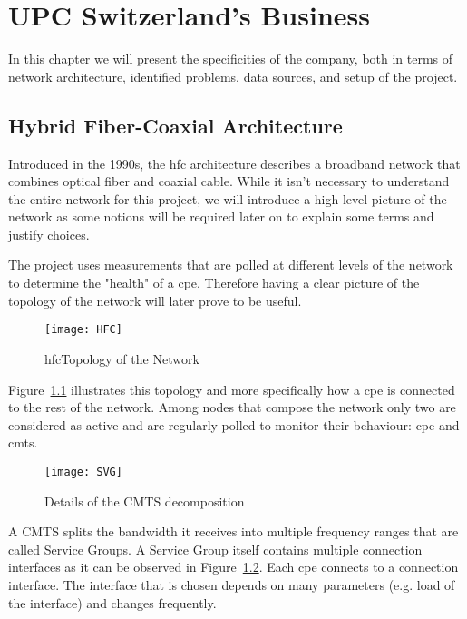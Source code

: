 \chapter{UPC Switzerland's Business}
In this chapter we will present the specificities of the company, both in terms of network architecture, identified problems, data sources, and setup of the project.

\section{Hybrid Fiber-Coaxial Architecture}
\label{sec:HFC_archi}
Introduced in the 1990s, the \acrfull{hfc}\cite{wiki:hfc} architecture describes a broadband network that combines optical fiber and coaxial cable. While it isn't necessary to understand the entire network for this project, we will introduce  a high-level picture of the network as some notions will be required later on to explain some terms and justify choices. 

\vspace{2 \baselineskip}
The project uses measurements that are polled at different levels of the network to determine the "health" of a \acrshort{cpe}. Therefore having a clear picture of the topology of the network will later prove to be useful. 

\begin{figure}[ht]
    \begin{center}
    \texttt{[image: HFC]}
    \end{center}
    \caption{\acrshort{hfc}Topology of the Network}
    \label{HFC}
\end{figure}

Figure~\ref{HFC} illustrates this topology and more specifically how a \acrshort{cpe} is connected to the rest of the network. Among nodes that compose the network only two are considered as active and are regularly polled to monitor their behaviour: \acrshort{cpe} and \acrfull{cmts}.

\begin{figure}[ht]
    \begin{center}
    \texttt{[image: SVG]}
    \end{center}
    \caption{Details of the CMTS decomposition}
    \label{SVG}
\end{figure}

A CMTS splits the bandwidth it receives into multiple frequency ranges that are called Service Groups. A Service Group itself contains multiple connection interfaces as it can be observed in Figure~\ref{SVG}. Each \acrshort{cpe} connects to a connection interface. The interface that is chosen depends on many parameters (e.g. load of the interface) and changes frequently. 

